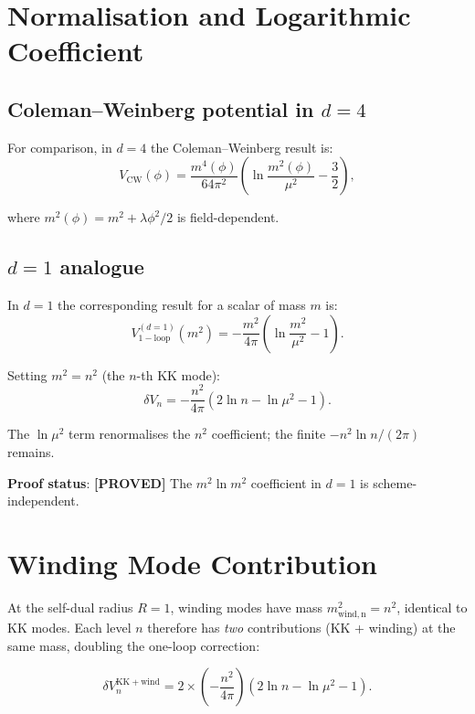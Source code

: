 \documentclass[11pt,a4paper]{article}
\newcommand{\proved}[1]{\textbf{[PROVED]} #1}
\begin{document}
\section{Normalisation and Logarithmic Coefficient}

\subsection{Coleman--Weinberg potential in $d = 4$}

For comparison, in $d = 4$ the Coleman--Weinberg result is:
\[
  V_\mathrm{CW}(\phi) = \frac{m^4(\phi)}{64\pi^2}
  \left(\ln\frac{m^2(\phi)}{\mu^2} - \frac{3}{2}\right),
\]

where $m^2(\phi) = m^2 + \lambda\phi^2/2$ is field-dependent.

\subsection{$d = 1$ analogue}

In $d = 1$ the corresponding result for a scalar of mass $m$ is:
\[
  V_\mathrm{1-loop}^{(d=1)}(m^2) = -\frac{m^2}{4\pi}
  \left(\ln\frac{m^2}{\mu^2} - 1\right).
\]

Setting $m^2 = n^2$ (the $n$-th KK mode):
\[
  \delta V_n = -\frac{n^2}{4\pi}\left(2\ln n - \ln\mu^2 - 1\right).
\]

The $\ln\mu^2$ term renormalises the $n^2$ coefficient; the finite
$-n^2\ln n/(2\pi)$ remains.

\textbf{Proof status}: \proved{The $m^2\ln m^2$ coefficient in $d=1$ is
scheme-independent.}

\section{Winding Mode Contribution}

At the self-dual radius $R = 1$, winding modes have mass $m_\mathrm{wind,n}^2 = n^2$,
identical to KK modes.  Each level $n$ therefore has \emph{two} contributions
(KK + winding) at the same mass, doubling the one-loop correction:

\[
  \delta V_n^\mathrm{KK+wind} = 2 \times \left(-\frac{n^2}{4\pi}\right)
  \left(2\ln n - \ln\mu^2 - 1\right).
\]
\end{document}
